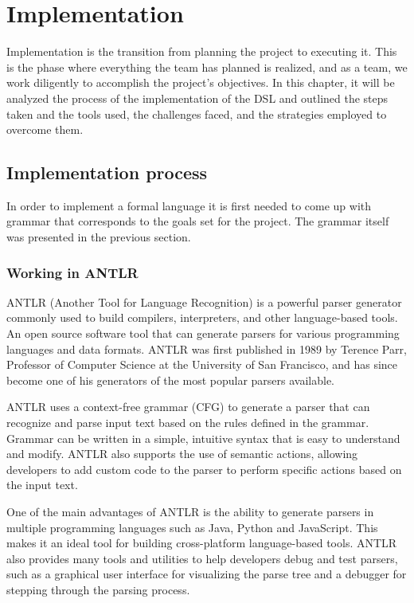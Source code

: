 \chapter{Implementation}
 Implementation is the transition from planning the project to executing it. This is the phase where everything the team has planned is realized, and as a team, we work diligently to accomplish the project's objectives. In this chapter, it will be analyzed the process of the implementation of the DSL and outlined the steps taken and the tools used, the challenges faced, and the strategies employed to overcome them.

\section{Implementation process} 
In order to implement a formal language it is first needed to come up with grammar that corresponds to the goals set for the project. The grammar itself was presented in the previous section. 

\subsection{Working in ANTLR}
ANTLR (Another Tool for Language Recognition) is a powerful parser generator commonly used to build compilers, interpreters, and other language-based tools. An open source software tool that can generate parsers for various programming languages and data formats. ANTLR was first published in 1989 by Terence Parr, Professor of Computer Science at the University of San Francisco, and has since become one of his generators of the most popular parsers available.

ANTLR uses a context-free grammar (CFG) to generate a parser that can recognize and parse input text based on the rules defined in the grammar. Grammar can be written in a simple, intuitive syntax that is easy to understand and modify. ANTLR also supports the use of semantic actions, allowing developers to add custom code to the parser to perform specific actions based on the input text.

One of the main advantages of ANTLR is the ability to generate parsers in multiple programming languages such as Java, Python and JavaScript. This makes it an ideal tool for building cross-platform language-based tools. ANTLR also provides many tools and utilities to help developers debug and test parsers, such as a graphical user interface for visualizing the parse tree and a debugger for stepping through the parsing process.

